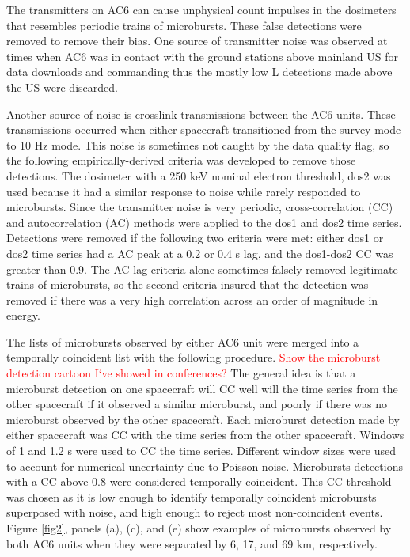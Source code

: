 \documentclass[draft]{agujournal2019}
\begin{document}
The transmitters on AC6 can cause unphysical count impulses in the dosimeters that resembles periodic trains of microbursts. These false detections were removed to remove their bias. One source of transmitter noise was observed at times when AC6 was in contact with the ground stations above mainland US for data downloads and commanding thus the mostly low L detections made above the US were discarded. 

Another source of noise is crosslink transmissions between the AC6 units. These transmissions occurred when either spacecraft transitioned from the survey mode to 10 Hz mode. This noise is sometimes not caught by the data quality flag, so the following empirically-derived criteria was developed to remove those detections. The dosimeter with a 250 keV nominal electron threshold, dos2 was used because it had a similar response to noise while rarely responded to microbursts. Since the transmitter noise is very periodic, cross-correlation (CC) and autocorrelation (AC) methods were applied to the dos1 and dos2 time series. Detections were removed if the following two criteria were met: either dos1 or dos2 time series had a AC peak at a 0.2 or 0.4 s lag, and the dos1-dos2 CC was greater than 0.9. The AC lag criteria alone sometimes falsely removed legitimate trains of microbursts, so the second criteria insured that the detection was removed if there was a very high correlation across an order of magnitude in energy.

The lists of microbursts observed by either AC6 unit were merged into a temporally coincident list with the following procedure. \textcolor{red}{Show the microburst detection cartoon I`ve showed in conferences?} The general idea is that a microburst detection on one spacecraft will CC well will the time series from the other spacecraft if it observed a similar microburst, and poorly if there was no microburst observed by the other spacecraft. Each microburst detection made by either spacecraft was CC with the time series from the other spacecraft. Windows of 1 and 1.2 s were used to CC the time series. Different window sizes were used to account for numerical uncertainty due to Poisson noise. Microbursts detections with a CC above 0.8 were considered temporally coincident. This CC threshold was chosen as it is low enough to identify temporally coincident microbursts superposed with noise, and high enough to reject most non-coincident events. Figure \ref{fig2}, panels (a), (c), and (e) show examples of microbursts observed by both AC6 units when they were separated by 6, 17, and 69 km, respectively. 
\end{document}
